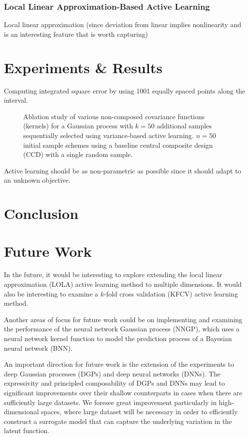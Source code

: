 \documentclass[conference]{IEEEtran}
\begin{document}
	\subsubsection{Local Linear Approximation-Based Active Learning}
	Local linear approximation (since deviation from linear implies nonlinearity and is an interesting feature that is worth capturing)
	    
	\section{Experiments \& Results}
	\label{sec:experiments-results}
	
	Computing integrated square error by using 1001 equally spaced points along the interval.
	
	\begin{figure}[ht]
		\centering
		
		\caption{Ablation study of various non-composed covariance functions (kernels) for a Gaussian process with $k=50$ additional samples sequentially selected using variance-based active learning. $n=50$ initial sample schemes using a baseline central composite design (CCD) with a single random sample.}
	\end{figure}
	
	
	Active learning should be as non-parametric as possible since it should adapt to an unknown objective.
	
	\section{Conclusion}
	\label{sec:conclusion}
	
	
	\section{Future Work}
	\label{sec:future-work}
	
	In the future, it would be interesting to explore extending the local linear approximation (LOLA) active learning method to multiple dimensions. It would also be interesting to examine a $k$-fold cross validation (KFCV) active learning method.
	
	Another areas of focus for future work could be on implementing and examining the performance of the neural network Gaussian process (NNGP), which uses a neural network kernel function to model the prediction process of a Bayesian neural network (BNN).
	
	An important direction for future work is the extension of the experiments to deep Gaussian processes (DGPs) and deep neural networks (DNNs). The expressivity and principled composability of DGPs and DNNs may lead to significant improvements over their shallow counterparts in cases when there are sufficiently large datasets. We foresee great improvement particularly in high-dimensional spaces, where large dataset will be necessary in order to efficiently construct a surrogate model that can capture the underlying variation in the latent function.
	
	
	
	
	
	
\end{document}
